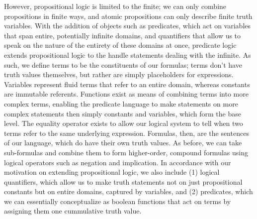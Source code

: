 \documentclass{article}
\begin{document}
However, propositional logic is limited to the finite; we can only combine propositions in finite ways, and atomic propositions can only describe finite truth variables. With the addition of objects such as predicates, which act on variables that span entire, potentially infinite domains, and quantifiers that allow us to speak on the nature of the entirety of these domains at once, predicate logic extends propositional logic to the handle statements dealing with the infinite. As such, we define terms to be the constituents of our formulas; terms don't have truth values themselves, but rather are simply placeholders for expressions. Variables represent fluid terms that refer to an entire domain, whereas constants are immutable referents. Functions exist as means of combining terms into more complex terms, enabling the predicate language to make statements on more complex statements then simply constants and variables, which form the base level. The equality operator exists to allow our logical system to tell when two terms refer to the same underlying expression. Formulas, then, are the sentences of our language, which do have their own truth values. As before, we can take sub-formulas and combine them to form higher-order, compound formulas using logical operators such as negation and implication. In accordance with our motivation on extending propositional logic, we also include (1) logical quantifiers, which allow us to make truth statements not on just propositional constants but on entire domains, captured by variables, and (2) predicates, which we can essentially conceptualize as boolean functions that act on terms by assigning them one cummulative truth value.
\end{document}
